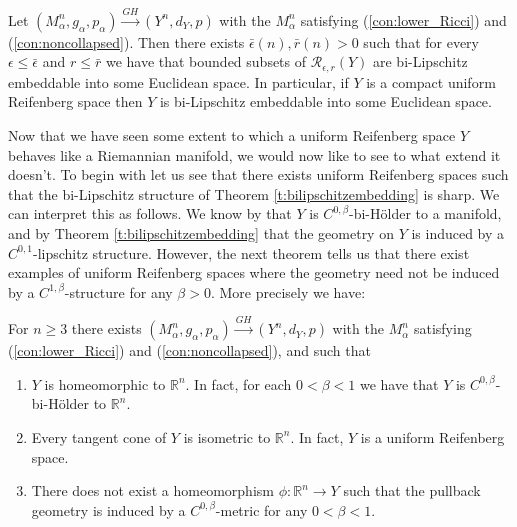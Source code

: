 \documentclass[11pt]{article}
\newcommand{\RR}{\mathds{R}}
\newcommand{\cR}{\mathcal{R}}
\begin{document}
\begin{theorem}\label{t:bilipschitzembedding}
 Let $(M^n_\alpha,g_\alpha,p_\alpha)\stackrel{GH}{\rightarrow} (Y^n,d_Y,p)$ with the $M^n_\alpha$ satisfying (\ref{con:lower_Ricci}) and (\ref{con:noncollapsed}).  Then there exists $\bar\epsilon(n),\bar r(n)>0$ such that for every $\epsilon\leq \bar\epsilon$ and $r\leq \bar r$ we have that bounded subsets of $\cR_{\epsilon,r}(Y)$ are bi-Lipschitz embeddable into some Euclidean space.  In particular, if $Y$ is a compact uniform Reifenberg space then $Y$ is bi-Lipschitz embeddable into some Euclidean space.
\end{theorem}

Now that we have seen some extent to which a uniform Reifenberg space $Y$ behaves like a Riemannian manifold, we would now like to see to what extend it doesn't.  To begin with let us see that there exists uniform Reifenberg spaces such that the bi-Lipschitz structure of Theorem \ref{t:bilipschitzembedding} is sharp.  We can interpret this as follows.  We know by \cite{ChC2} that $Y$ is $C^{0,\beta}$-bi-H\"older to a manifold, and by Theorem \ref{t:bilipschitzembedding} that the geometry on $Y$ is induced by a $C^{0,1}$-lipschitz structure.  However, the next theorem tells us that there exist examples of uniform Reifenberg spaces where the geometry need not be induced by a $C^{1,\beta}$-structure for any $\beta>0$.  More precisely we have:

\begin{theorem}\label{t:nodiffeomorphism}
 For $n\geq 3$ there exists $(M^n_\alpha,g_\alpha,p_\alpha)\stackrel{GH}{\rightarrow} (Y^n,d_Y,p)$ with the $M^n_\alpha$ satisfying (\ref{con:lower_Ricci}) and (\ref{con:noncollapsed}), and such that
 \begin{enumerate}
 \item $Y$ is homeomorphic to $\RR^n$.  In fact, for each $0<\beta<1$ we have that $Y$ is $C^{0,\beta}$-bi-H\"older to $\RR^n$.
 \item Every tangent cone of $Y$ is isometric to $\RR^n$.  In fact, $Y$ is a uniform Reifenberg space.
 \item There does not exist a homeomorphism $\phi:\RR^n\to Y$ such that the pullback geometry is induced by a $C^{0,\beta}$-metric for any $0<\beta<1$.
 \end{enumerate}
\end{theorem}
\end{document}
